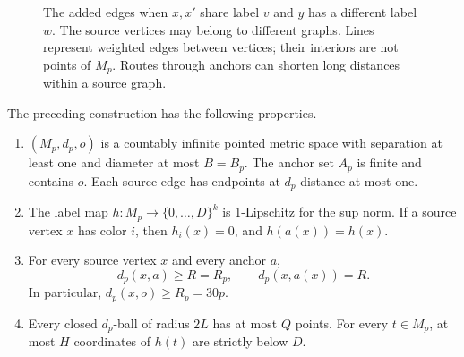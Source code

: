 \begin{figure}[ht]
\centering
{}
\caption{The added edges when $x,x'$ share label $v$ and $y$ has a different
label $w$.
The source vertices may belong to different graphs. Lines represent weighted
edges between vertices; their interiors are not points of $M_p$. Routes
through anchors can shorten long distances within a source graph.}
\label{fig:anchors}
\end{figure}

\begin{lemma}\label{lem:block-geometry}
The preceding construction has the following properties.
\begin{enumerate}[label=\textup{(\roman*)}]
\item $(M_p,d_p,o)$ is a countably infinite pointed metric space with
separation at least one and diameter at most $B=B_p$. The anchor set $A_p$
is finite and contains $o$. Each source edge has endpoints at $d_p$-distance
at most one.
\item The label map $h:M_p\to\{0,\ldots,D\}^k$ is 1-Lipschitz for the
sup norm. If a source vertex $x$ has color $i$, then $h_i(x)=0$, and
$h(a(x))=h(x)$.
\item For every source vertex $x$ and every anchor $a$,
\[
 d_p(x,a)\ge R=R_p,\qquad d_p(x,a(x))=R.
\]
In particular, $d_p(x,o)\ge R_p=30p$.
\item Every closed $d_p$-ball of radius $2L$ has at most $Q$ points.
For every $t\in M_p$, at most $H$ coordinates of $h(t)$ are strictly
below $D$.
\end{enumerate}
\end{lemma}

